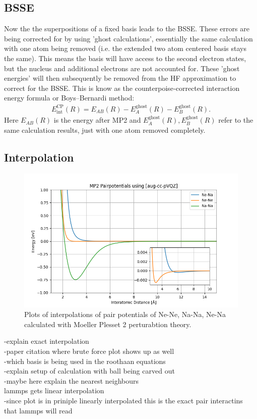 \subsection{\ac{BSSE}}
Now the the superpositions of a fixed basis leads to the \ac{BSSE}. These errors are being corrected for by using 'ghost calculations', essentially the same calculation with one atom being removed (i.e. the extended two atom centered basis stays the same). This means the basis will have access to the second electron states, but the nucleus and additional electrons are not accounted for. These 'ghost energies' will then subsequently be removed from the \ac{HF}
approximation to correct for the \ac{BSSE}.
This is know as the counterpoise‐corrected interaction energy formula or Boys–Bernardi method: %
\begin{align}
	E_{\text {int}}^{\text {CP}}(R)=E_{A B}(R)-E_A^{\text {ghost}}(R)-E_B^{\text {ghost}}(R).
\end{align}
Here $E_{A B}(R)$ is the energy after \ac{MP2} and $E_A^{\text {ghost}}(R),E_B^{\text {ghost}}(R)$ refer to the same calculation results, just with one atom removed completely.
\subsection{Interpolation}

\begin{figure}[h!]
	\centering
	\includegraphics[scale = 0.7]{Inhalt/Bilder/pairpotential.png}
	\caption{Plots of interpolations of pair potentials of Ne-Ne, Na-Na, Ne-Na calculated with Moeller Plesset 2 perturabtion theory.}
	\label{fig:pairpotential}
\end{figure}
-explain exact interpolation\\
-paper citation where brute force plot shows up as well\\
-which basis is being used in the roothaan equations \\
-explain setup of calculation with ball being carved out\\
-maybe here explain the nearest neighbours\\
lammps gets linear interpolation\\
-since plot is in priniple linearly interpolated this is the exact pair interactins that lammps will read
